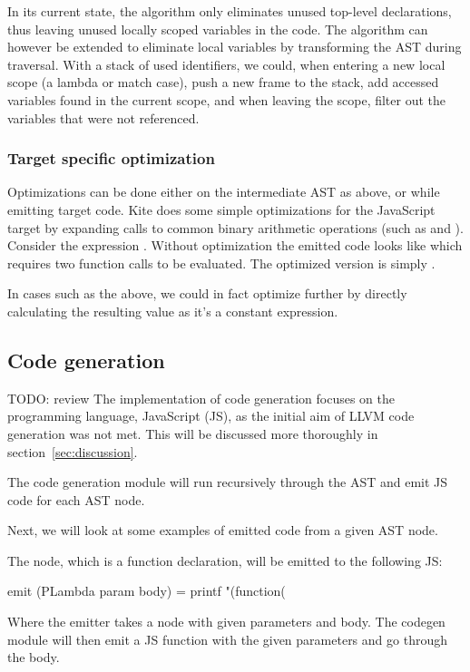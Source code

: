 In its current state, the algorithm only eliminates unused top-level declarations, thus leaving unused locally scoped variables in the code. The algorithm can however be extended to eliminate local variables by transforming the AST during traversal. With a stack of used identifiers, we could, when entering a new local scope (a lambda or match case), push a new frame to the stack, add accessed variables found in the current scope, and when leaving the scope, filter out the variables that were not referenced.

\subsubsection{Target specific optimization}
Optimizations can be done either on the intermediate AST as above, or while emitting target code. Kite does some simple optimizations for the JavaScript target by expanding calls to common binary arithmetic operations (such as \code{+} and \code{*}). Consider the expression . Without optimization the emitted code looks like  which  requires two function calls to be evaluated. The optimized version is simply .

In cases such as the above, we could in fact optimize further by directly calculating the resulting value as it's a constant expression.


\subsection{Code generation} TODO: review
The implementation of code generation focuses on the programming language, JavaScript (JS), as the initial aim of LLVM code generation was not met. This will be discussed more thoroughly in section~\ref{sec:discussion}.

The code generation module will run recursively through the AST and emit JS code for each AST node.

Next, we will look at some examples of emitted code from a given AST node.

The  node, which is a function declaration, will be emitted to the following JS:
\begin{haskell}
emit (PLambda param body) = printf "(function(%
\end{haskell}

Where the emitter takes a  node with given parameters and body. The codegen module will then emit a JS function with the given parameters and go through the body.

